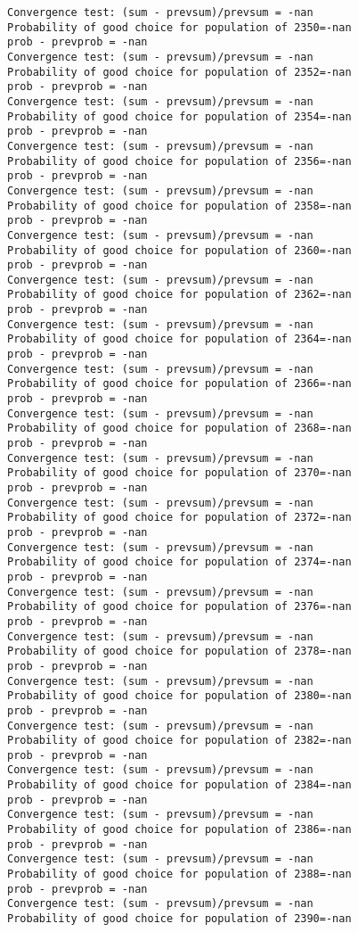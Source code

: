 \documentclass[11pt,onecolumn]{article}
\begin{document}
\begin{verbatim}
Convergence test: (sum - prevsum)/prevsum = -nan
Probability of good choice for population of 2350=-nan
prob - prevprob = -nan
Convergence test: (sum - prevsum)/prevsum = -nan
Probability of good choice for population of 2352=-nan
prob - prevprob = -nan
Convergence test: (sum - prevsum)/prevsum = -nan
Probability of good choice for population of 2354=-nan
prob - prevprob = -nan
Convergence test: (sum - prevsum)/prevsum = -nan
Probability of good choice for population of 2356=-nan
prob - prevprob = -nan
Convergence test: (sum - prevsum)/prevsum = -nan
Probability of good choice for population of 2358=-nan
prob - prevprob = -nan
Convergence test: (sum - prevsum)/prevsum = -nan
Probability of good choice for population of 2360=-nan
prob - prevprob = -nan
Convergence test: (sum - prevsum)/prevsum = -nan
Probability of good choice for population of 2362=-nan
prob - prevprob = -nan
Convergence test: (sum - prevsum)/prevsum = -nan
Probability of good choice for population of 2364=-nan
prob - prevprob = -nan
Convergence test: (sum - prevsum)/prevsum = -nan
Probability of good choice for population of 2366=-nan
prob - prevprob = -nan
Convergence test: (sum - prevsum)/prevsum = -nan
Probability of good choice for population of 2368=-nan
prob - prevprob = -nan
Convergence test: (sum - prevsum)/prevsum = -nan
Probability of good choice for population of 2370=-nan
prob - prevprob = -nan
Convergence test: (sum - prevsum)/prevsum = -nan
Probability of good choice for population of 2372=-nan
prob - prevprob = -nan
Convergence test: (sum - prevsum)/prevsum = -nan
Probability of good choice for population of 2374=-nan
prob - prevprob = -nan
Convergence test: (sum - prevsum)/prevsum = -nan
Probability of good choice for population of 2376=-nan
prob - prevprob = -nan
Convergence test: (sum - prevsum)/prevsum = -nan
Probability of good choice for population of 2378=-nan
prob - prevprob = -nan
Convergence test: (sum - prevsum)/prevsum = -nan
Probability of good choice for population of 2380=-nan
prob - prevprob = -nan
Convergence test: (sum - prevsum)/prevsum = -nan
Probability of good choice for population of 2382=-nan
prob - prevprob = -nan
Convergence test: (sum - prevsum)/prevsum = -nan
Probability of good choice for population of 2384=-nan
prob - prevprob = -nan
Convergence test: (sum - prevsum)/prevsum = -nan
Probability of good choice for population of 2386=-nan
prob - prevprob = -nan
Convergence test: (sum - prevsum)/prevsum = -nan
Probability of good choice for population of 2388=-nan
prob - prevprob = -nan
Convergence test: (sum - prevsum)/prevsum = -nan
Probability of good choice for population of 2390=-nan

\end{verbatim}
\end{document}
